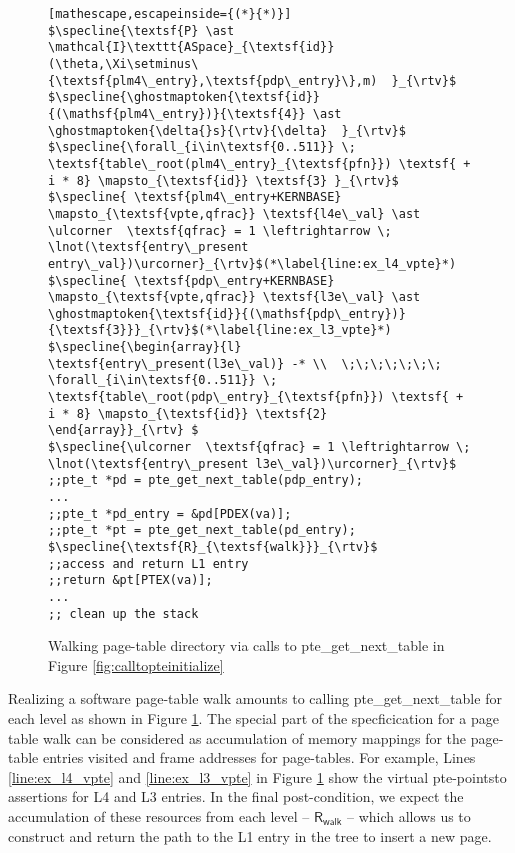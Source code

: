 \begin{figure}
\begin{lstlisting}[mathescape,escapeinside={(*}{*)}]
$\specline{\textsf{P} \ast \mathcal{I}\texttt{ASpace}_{\textsf{id}}(\theta,\Xi\setminus\{\textsf{plm4\_entry},\textsf{pdp\_entry}\},m)  }_{\rtv}$
$\specline{\ghostmaptoken{\textsf{id}}{(\mathsf{plm4\_entry})}{\textsf{4}} \ast \ghostmaptoken{\delta{}s}{\rtv}{\delta}  }_{\rtv}$
$\specline{\forall_{i\in\textsf{0..511}} \; \textsf{table\_root(plm4\_entry}_{\textsf{pfn}}) \textsf{ + i * 8} \mapsto_{\textsf{id}} \textsf{3} }_{\rtv}$
$\specline{ \textsf{plm4\_entry+KERNBASE} \mapsto_{\textsf{vpte,qfrac}} \textsf{l4e\_val} \ast \ulcorner  \textsf{qfrac} = 1 \leftrightarrow \; \lnot(\textsf{entry\_present entry\_val})\urcorner}_{\rtv}$(*\label{line:ex_l4_vpte}*)
$\specline{ \textsf{pdp\_entry+KERNBASE} \mapsto_{\textsf{vpte,qfrac}} \textsf{l3e\_val} \ast \ghostmaptoken{\textsf{id}}{(\mathsf{pdp\_entry})}{\textsf{3}}}_{\rtv}$(*\label{line:ex_l3_vpte}*)
$\specline{\begin{array}{l} \textsf{entry\_present(l3e\_val)} -* \\  \;\;\;\;\;\;\; \forall_{i\in\textsf{0..511}} \; \textsf{table\_root(pdp\_entry}_{\textsf{pfn}}) \textsf{ + i * 8} \mapsto_{\textsf{id}} \textsf{2}    \end{array}}_{\rtv} $
$\specline{\ulcorner  \textsf{qfrac} = 1 \leftrightarrow \; \lnot(\textsf{entry\_present l3e\_val})\urcorner}_{\rtv}$
;;pte_t *pd = pte_get_next_table(pdp_entry);
...
;;pte_t *pd_entry = &pd[PDEX(va)];
;;pte_t *pt = pte_get_next_table(pd_entry);
$\specline{\textsf{R}_{\textsf{walk}}}_{\rtv}$
;;access and return L1 entry
;;return &pt[PTEX(va)];
...
;; clean up the stack 
\end{lstlisting}
\vspace{-1em}
\caption{Walking page-table directory via calls to \textsf{pte\_get\_next\_table} in Figure \ref{fig:calltopteinitialize}}
\label{walkpgdir}
\end{figure}

Realizing a software page-table walk amounts to calling \textsf{pte\_get\_next\_table} for each level as shown in Figure \ref{walkpgdir}. 
The special part of the specficication for a page table walk can be considered as accumulation of memory mappings for the page-table entries 
visited and frame addresses for page-tables. 
For example, Lines \ref{line:ex_l4_vpte} and \ref{line:ex_l3_vpte} in Figure \ref{walkpgdir} show the virtual pte-pointsto assertions for L4 and L3 entries.
In the final post-condition, we expect the accumulation of these resources from each level -- $\textsf{R}_{\textsf{walk}}$ -- 
which allows us to construct and return the path to the L1 entry in the tree to insert a new page.  

